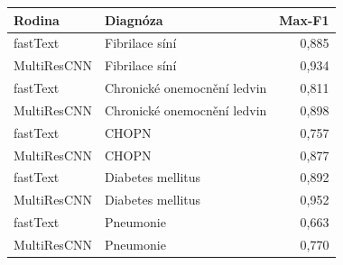 \begin{tabular}{llr}
\toprule
Rodina & Diagnóza & Max-F1\\
\midrule
fastText & Fibrilace síní & 0,885\\
MultiResCNN & Fibrilace síní & 0,934\\
fastText & Chronické onemocnění ledvin & 0,811\\
MultiResCNN & Chronické onemocnění ledvin & 0,898\\
fastText & CHOPN & 0,757\\
MultiResCNN & CHOPN & 0,877\\
fastText & Diabetes mellitus & 0,892\\
MultiResCNN & Diabetes mellitus & 0,952\\
fastText & Pneumonie & 0,663\\
MultiResCNN & Pneumonie & 0,770\\
\bottomrule
\end{tabular}
